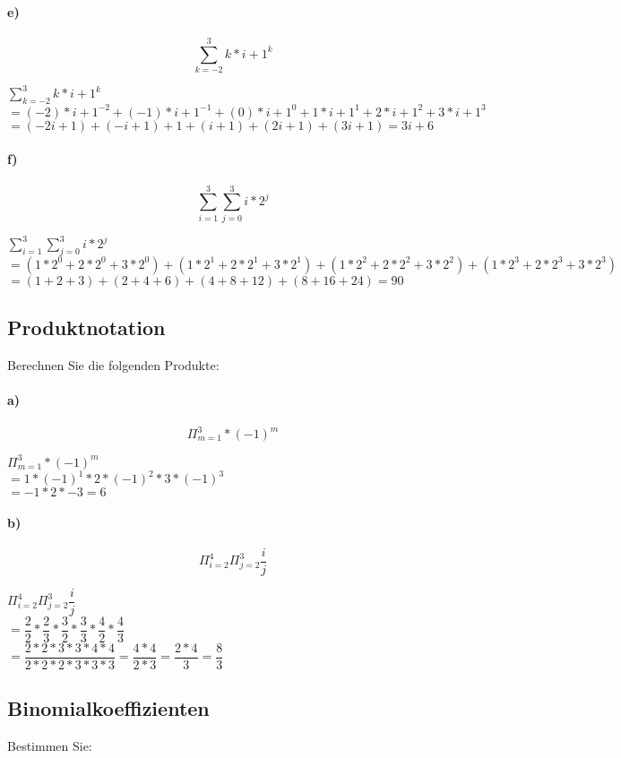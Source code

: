 \documentclass[paper=a4, fontsize=11pt]{scrartcl}
\numberwithin{equation}{section}
\numberwithin{figure}{section}
\numberwithin{table}{section}
\begin{document}
\paragraph{e)}
$$\sum^{3}_{k=-2}k*i+1^{k}$$

$\sum^{3}_{k=-2}k*i+1^{k}$ \\
$=
(-2)*i+1^{-2} + (-1)*i+1^{-1} + (0)*i+1^{0}
+ 1*i+1^{1} + 2*i+1^{2} + 3*i+1^{3}$ \\
$=
(-2i+1)+(-i+1)+1+(i+1)+(2i+1)+(3i+1) = 3i+6
$
\paragraph{f)}
$$\sum^{3}_{i=1} \sum^{3}_{j=0}i*2^{j}$$

$\sum^{3}_{i=1} \sum^{3}_{j=0}i*2^{j}$ \\
$=
(1*2^{0}+2*2^{0}+3*2^{0})
+(1*2^{1}+2*2^{1}+3*2^{1})
+(1*2^{2}+2*2^{2}+3*2^{2})
+(1*2^{3}+2*2^{3}+3*2^{3})$ \\
$=
(1+2+3)+(2+4+6)+(4+8+12)+(8+16+24) = 90$
\subsection{Produktnotation}
Berechnen Sie die folgenden Produkte:
\paragraph{a)}
$$\Pi^{3}_{m=1}*(-1)^{m}$$

$\Pi^{3}_{m=1}*(-1)^{m}$ \\
$=1*(-1)^{1} *2*(-1)^{2} * 3*(-1)^{3}$ \\
$= -1* 2 *-3 = 6$
\paragraph{b)}
$$\Pi^{4}_{i=2} \Pi^{3}_{j=2} \dfrac{i}{j}$$

$\Pi^{4}_{i=2} \Pi^{3}_{j=2} \dfrac{i}{j}$ \\
$= \dfrac{2}{2} * \dfrac{2}{3}
* \dfrac{3}{2} * \dfrac{3}{3} 
* \dfrac{4}{2} * \dfrac{4}{3}$ \\
$= \dfrac{2*2*3*3*4*4}{2*2*2*3*3*3}
= \dfrac{4*4}{2*3}
= \dfrac{2*4}{3}
= \dfrac{8}{3}$
\subsection{Binomialkoeffizienten}
Bestimmen Sie:
\end{document}

